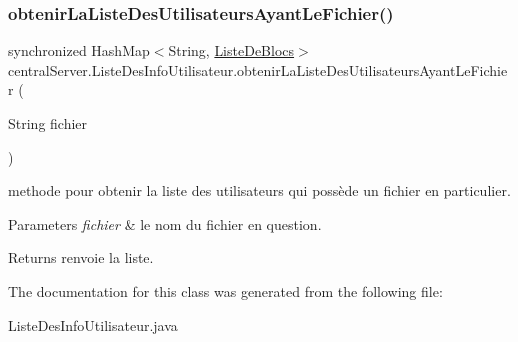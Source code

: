\subsubsection{\texorpdfstring{obtenir\+La\+Liste\+Des\+Utilisateurs\+Ayant\+Le\+Fichier()}{obtenirLaListeDesUtilisateursAyantLeFichier()}}
{\footnotesize\ttfamily synchronized Hash\+Map$<$String, \hyperlink{classcommun_1_1ListeDeBlocs}{Liste\+De\+Blocs}$>$ central\+Server.\+Liste\+Des\+Info\+Utilisateur.\+obtenir\+La\+Liste\+Des\+Utilisateurs\+Ayant\+Le\+Fichier (\begin{DoxyParamCaption}\item[{String}]{fichier }\end{DoxyParamCaption})\hspace{0.3cm}{\ttfamily [inline]}}



methode pour obtenir la liste des utilisateurs qui possède un fichier en particulier. 


\begin{DoxyParams}{Parameters}
{\em fichier} & le nom du fichier en question. \\
\hline
\end{DoxyParams}
\begin{DoxyReturn}{Returns}
renvoie la liste. 
\end{DoxyReturn}


The documentation for this class was generated from the following file\+:\begin{DoxyCompactItemize}
\item 
Liste\+Des\+Info\+Utilisateur.\+java\end{DoxyCompactItemize}
